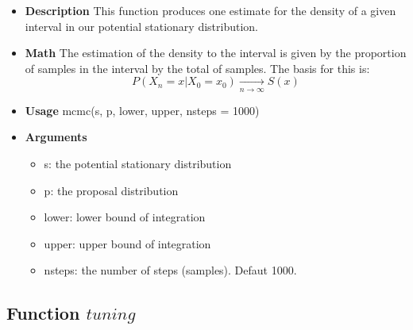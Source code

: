\documentclass{article}
\begin{document}
\begin{itemize}
    \item \textbf{Description}\newline
    This function produces one estimate for the density of a given interval in our potential stationary distribution.
    
    \item \textbf{Math}\newline
    The estimation of the density to the interval is given by the proportion of samples in the interval by the total of samples. The basis for this is:
    $$P(X_n = x|X_0 = x_0) \xrightarrow[n \rightarrow \infty] {}S(x)$$
    
    \item \textbf{Usage}\newline
    mcmc(s, p, lower, upper, nsteps = 1000)
    
    \item \textbf{Arguments}
    
    \begin{itemize}
        \item s: the potential stationary distribution 
        \item p: the proposal distribution
        \item lower: lower bound of integration
        \item upper: upper bound of integration
        \item nsteps: the number of steps (samples). Defaut 1000.
    \end{itemize}
\end{itemize}

\subsection{Function $tuning$}
\end{document}
